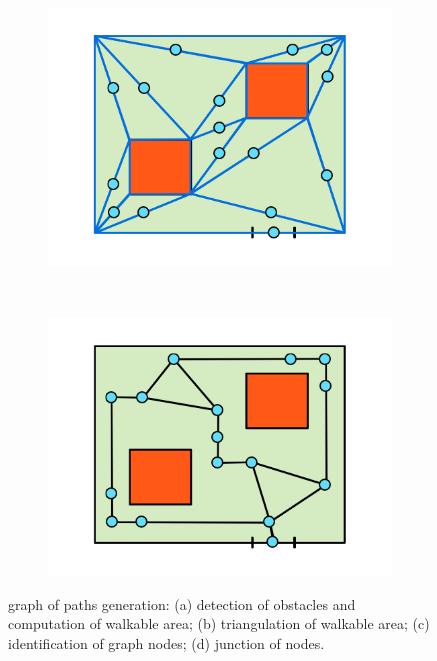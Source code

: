 \begin{figure}[!htbp]
\begin{subfigure}[b]{0.235\textwidth}
 \includegraphics[width=\textwidth]{images/graph-generation/single/graph-generation-3}
 \caption{}
 \label{fig:graph-generation-c}
 \end{subfigure}
 ~
 \begin{subfigure}[b]{0.235\textwidth}
 \includegraphics[width=\textwidth]{images/graph-generation/single/graph-generation-4}
 \caption{}
 \label{fig:graph-generation-d}
 \end{subfigure}
 
 \caption{graph of paths generation: 
 (a) detection of obstacles and computation of walkable area; 
 (b) triangulation of walkable area; 
 (c) identification of graph nodes; 
 (d) junction of nodes.
 }
 \label{fig:graph-generation}
\end{figure}

